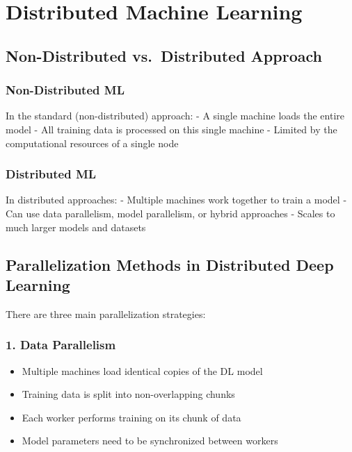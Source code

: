\documentclass[
  letterpaper,
  DIV=11,
  numbers=noendperiod]{scrreprt}
\providecommand{\tightlist}{%
  \setlength{\itemsep}{0pt}\setlength{\parskip}{0pt}}\usepackage{longtable,booktabs,array}
\begin{document}
\section{Distributed Machine
Learning}\label{distributed-machine-learning}

\subsection{Non-Distributed vs.~Distributed
Approach}\label{non-distributed-vs.-distributed-approach}

\subsubsection{Non-Distributed ML}\label{non-distributed-ml}

In the standard (non-distributed) approach: - A single machine loads the
entire model - All training data is processed on this single machine -
Limited by the computational resources of a single node

\subsubsection{Distributed ML}\label{distributed-ml}

In distributed approaches: - Multiple machines work together to train a
model - Can use data parallelism, model parallelism, or hybrid
approaches - Scales to much larger models and datasets

\subsection{Parallelization Methods in Distributed Deep
Learning}\label{parallelization-methods-in-distributed-deep-learning}

There are three main parallelization strategies:

\subsubsection{1. Data Parallelism}\label{data-parallelism}

\begin{itemize}
\tightlist
\item
  Multiple machines load identical copies of the DL model
\item
  Training data is split into non-overlapping chunks
\item
  Each worker performs training on its chunk of data
\item
  Model parameters need to be synchronized between workers
\end{itemize}
\end{document}

